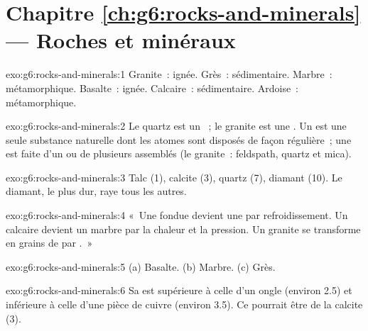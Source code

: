 \section*{Chapitre \ref{ch:g6:rocks-and-minerals} --- Roches et minéraux}

\begin{solution}{exo:g6:rocks-and-minerals:1}
Granite~: ignée. Grès~: sédimentaire. Marbre~: métamorphique. Basalte~:
ignée. Calcaire~: sédimentaire. Ardoise~: métamorphique.
\end{solution}

\begin{solution}{exo:g6:rocks-and-minerals:2}
Le quartz est un ~; le granite est une . Un  est une
seule substance naturelle dont les atomes sont disposés de façon
régulière~; une  est faite d'un ou de plusieurs  assemblés
(le granite~: feldspath, quartz et mica).
\end{solution}

\begin{solution}{exo:g6:rocks-and-minerals:3}
Talc (1), calcite (3), quartz (7), diamant (10). Le diamant, le plus dur,
raye tous les autres.
\end{solution}

\begin{solution}{exo:g6:rocks-and-minerals:4}
«~Une  fondue devient une  par refroidissement. Un calcaire
devient un marbre par la chaleur et la pression. Un granite se transforme
en grains de  par .~»
\end{solution}

\begin{solution}{exo:g6:rocks-and-minerals:5}
(a) Basalte. (b) Marbre. (c) Grès.
\end{solution}

\begin{solution}{exo:g6:rocks-and-minerals:6}
Sa  est supérieure à celle d'un ongle (environ 2.5) et inférieure à
celle d'une pièce de cuivre (environ 3.5). Ce pourrait être de la calcite
(3).
\end{solution}

